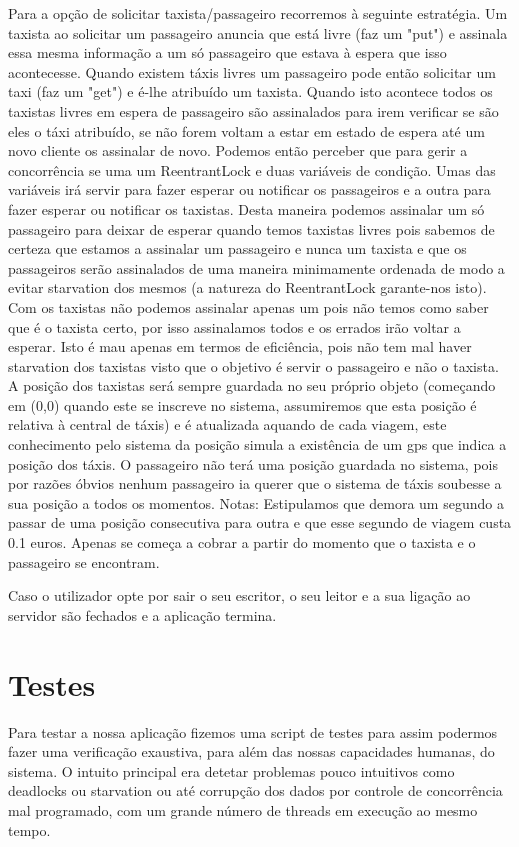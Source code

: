 Para a opção de solicitar taxista/passageiro recorremos à seguinte estratégia. Um taxista ao solicitar um passageiro anuncia que está livre (faz um "put") e assinala essa mesma informação a um só passageiro que estava à espera que isso acontecesse. Quando existem táxis livres um passageiro pode então solicitar um taxi (faz um "get") e é-lhe atribuído um taxista. Quando isto acontece todos os taxistas livres em espera de passageiro são assinalados para irem verificar se são eles o táxi atribuído, se não forem voltam a estar em estado de espera até um novo cliente os assinalar de novo. Podemos então perceber que para gerir a concorrência se uma um ReentrantLock e duas variáveis de condição. Umas das variáveis irá servir para fazer esperar ou notificar os passageiros e a outra para fazer esperar ou notificar os taxistas. Desta maneira podemos assinalar um só passageiro para deixar de esperar quando temos taxistas livres pois sabemos de certeza que estamos a assinalar um passageiro e nunca um taxista e que os passageiros serão assinalados de uma maneira minimamente ordenada de modo a evitar starvation dos mesmos (a natureza do ReentrantLock garante-nos isto). Com os taxistas não podemos assinalar apenas um pois não temos como saber que é o taxista certo, por isso assinalamos todos e os errados irão voltar a esperar. Isto é mau apenas em termos de eficiência, pois não tem mal haver starvation dos taxistas visto que o objetivo é servir o passageiro e não o taxista. A posição dos taxistas será sempre guardada no seu próprio objeto (começando em (0,0) quando este se inscreve no sistema, assumiremos que esta posição é relativa à central de táxis) e é atualizada aquando de cada viagem, este conhecimento pelo sistema da posição simula a existência de um gps que indica a posição dos táxis. O passageiro não terá uma posição guardada no sistema, pois por razões óbvios nenhum passageiro ia querer que o sistema de táxis soubesse a sua posição a todos os momentos.
Notas: Estipulamos que demora um segundo a passar de uma posição consecutiva para outra e que esse segundo de viagem custa 0.1 euros. Apenas se começa a cobrar a partir do momento que o taxista e o passageiro se encontram. 

Caso o utilizador opte por sair o seu escritor, o seu leitor e a sua ligação ao servidor são fechados e a aplicação termina.


\section{Testes}

Para testar a nossa aplicação fizemos uma script de testes para assim podermos fazer uma verificação exaustiva, para além das nossas capacidades humanas, do sistema. O intuito principal era detetar problemas pouco intuitivos como deadlocks ou starvation ou até corrupção dos dados por controle de concorrência mal programado, com um grande número de threads em execução ao mesmo tempo.





